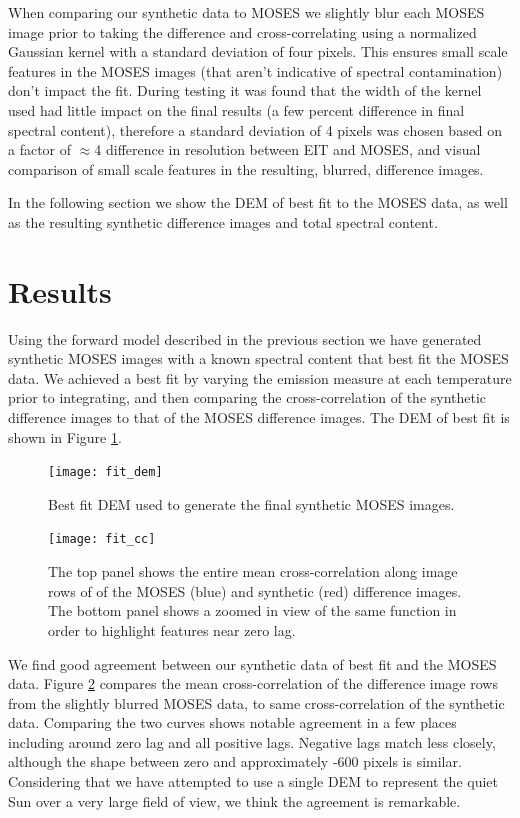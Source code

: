 		When comparing our synthetic data to MOSES we slightly blur each MOSES image prior to taking the difference and cross-correlating using a normalized Gaussian kernel with a standard deviation of four pixels.
		This ensures small scale features in the MOSES images (that aren't indicative of spectral contamination) don't impact the fit.
		During testing it was found that the width of the kernel used had little impact on the final results (a few percent difference in final spectral content), therefore a standard deviation of 4 pixels was chosen based on a factor of $\approx$4 difference in resolution between EIT and MOSES, and visual comparison of small scale features in the resulting, blurred, difference images.
		
		In the following section we show the DEM of best fit to the MOSES data, as well as the resulting synthetic difference images and total spectral content.
	

\section{Results}\label{sec:results}
	Using the forward model described in the previous section we have generated synthetic MOSES images with a known spectral content that best fit the MOSES data.
	We achieved a best fit by varying the emission measure at each temperature prior to integrating, and then comparing the cross-correlation of the synthetic difference images to that of the MOSES difference images.
	The DEM of best fit is shown in Figure \ref{fig:dem}.
	
	\begin{figure}
		\centering
		\texttt{[image: fit\_dem]}
		\caption{Best fit DEM used to generate the final synthetic MOSES images.}
		\label{fig:dem}
	\end{figure}

	\begin{figure}
		\centering
		\texttt{[image: fit\_cc]}
		\caption{The top panel shows the entire mean cross-correlation along image rows of of the MOSES (blue) and synthetic (red) difference images.  The bottom panel shows a zoomed in view of the same function in order to highlight features near zero lag.}
		\label{fig:fit_cc}
	\end{figure}
	
	We find good agreement between our synthetic data of best fit and the MOSES data.
	Figure \ref{fig:fit_cc} compares the mean cross-correlation of the difference image rows from the slightly blurred MOSES data, to same cross-correlation of the synthetic data.
	Comparing the two curves shows notable agreement in a few places including around zero lag and all positive lags.
	Negative lags match less closely, although the shape between zero and approximately -600 pixels is similar. 
	Considering that we have attempted to use a single DEM to represent the quiet Sun over a very large field of view, we think the agreement is remarkable.

